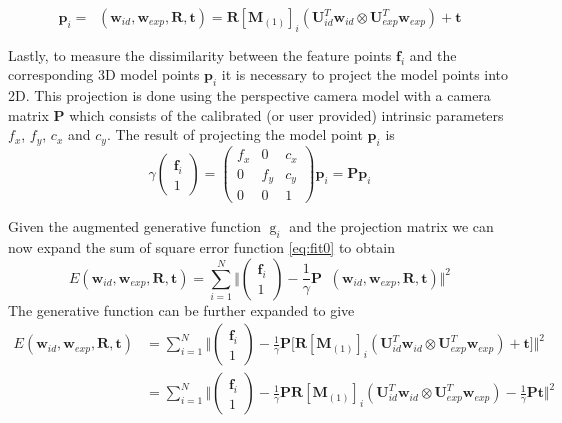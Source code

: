 \documentclass[11pt,a4paper,twoside]{report}
\begin{document}
\begin{equation}\label{eq:fit3}
\mathbf{p}_i = \mathop{g_i}(\mathbf{w}_{id},\mathbf{w}_{exp},\mathbf{R},\mathbf{t})
= \mathbf{R}[\mathbf{M}_{(1)}]_{i}(\mathbf{U}_{id}^T\mathbf{w}_{id} \otimes
\mathbf{U}_{exp}^T\mathbf{w}_{exp}) + \mathbf{t}
\end{equation}

Lastly, to measure the dissimilarity between the feature points $\mathbf{f}_i$ and the
corresponding 3D model points $\mathbf{p}_i$ it is necessary to project the model points
into 2D. This projection is done using the perspective camera model with a
camera matrix $\mathbf{P}$ which consists of the calibrated (or
user provided) intrinsic parameters $f_x$, $f_y$, $c_x$ and $c_y$. The result of
projecting the model point $\mathbf{p}_i$ is 
\begin{equation}\label{eq:fit5}
\gamma\begin{pmatrix}\mathbf{f}_i\\1\end{pmatrix}
= \begin{pmatrix}f_x&0&c_x\\0&f_y&c_y\\0&0&1\end{pmatrix}\mathbf{p}_i
    = \mathbf{P}\mathbf{p}_i
\end{equation}

Given the augmented generative function $\mathop{g}_i$ and the projection matrix we can now expand the
sum of square error function \ref{eq:fit0} to obtain
\begin{equation}\label{eq:fit6}
E(\mathbf{w}_{id}, \mathbf{w}_{exp}, \mathbf{R}, \mathbf{t}) = \sum_{i=1}^N \Big\Vert\begin{pmatrix}\mathbf{f}_i\\1\end{pmatrix} - \frac{1}{\gamma}\mathbf{P}\mathop{g_i}(\mathbf{w}_{id},\mathbf{w}_{exp},\mathbf{R},\mathbf{t})\Big\Vert^2
\end{equation}
The generative function can be further expanded to give
\begin{align}\label{eq:fit7}
E(\mathbf{w}_{id}, \mathbf{w}_{exp}, \mathbf{R}, \mathbf{t}) &= \sum_{i=1}^N \Big\Vert\begin{pmatrix}\mathbf{f}_i\\1\end{pmatrix} - \frac{1}{\gamma}\mathbf{P}\bigr[\mathbf{R}[\mathbf{M}_{(1)}]_{i}(\mathbf{U}_{id}^T\mathbf{w}_{id} \otimes
\mathbf{U}_{exp}^T\mathbf{w}_{exp}) + \mathbf{t}\bigl]\Big\Vert^2\\\label{eq:fit8}
&=\sum_{i=1}^N \Big\Vert\begin{pmatrix}\mathbf{f}_i\\1\end{pmatrix} - \frac{1}{\gamma}\mathbf{P}\mathbf{R}[\mathbf{M}_{(1)}]_{i}(\mathbf{U}_{id}^T\mathbf{w}_{id} \otimes
\mathbf{U}_{exp}^T\mathbf{w}_{exp}) - \frac{1}{\gamma}\mathbf{P}\mathbf{t}\Big\Vert^2
\end{align}
\end{document}
